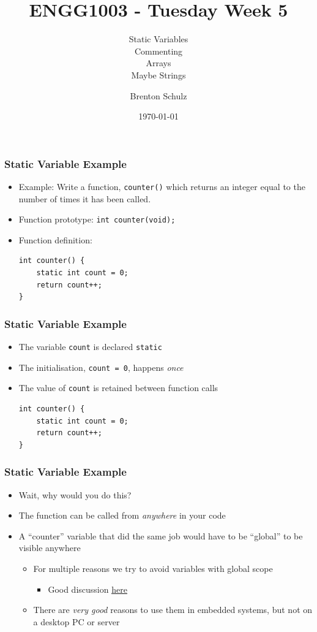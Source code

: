 \documentclass[14pt]{beamer}
\title{ENGG1003 - Tuesday Week 5}
\subtitle{Static Variables\\Commenting\\Arrays\\Maybe Strings}
\author{Brenton Schulz}
\institute{University of Newcastle}
\date{\today}
\begin{document}
\titlepage

\begin{frame}[fragile]
\frametitle{Static Variable Example}
\begin{itemize}
\item Example: Write a function, \texttt{counter()} which returns an integer equal to the number of times it has been called.
\pause
\item Function prototype: \texttt{int counter(void);}
\pause
\item Function definition:
\begin{lstlisting}[style=CStyle]
int counter() {
	static int count = 0;
	return count++;
}
\end{lstlisting}
\end{itemize}
\end{frame}

\begin{frame}[fragile]
\frametitle{Static Variable Example}
\begin{itemize}
\item The variable \texttt{count} is declared \texttt{static}
\item The initialisation, \texttt{count = 0}, happens \textit{once}
\item The value of \texttt{count} is retained between function calls 
\begin{lstlisting}[style=CStyle]
int counter() {
	static int count = 0;
	return count++;
}
\end{lstlisting}
\end{itemize}
\end{frame}

\begin{frame}
\frametitle{Static Variable Example}
\begin{itemize}
\item Wait, why would you do this?
\pause
\item The function can be called from \textit{anywhere} in your code
\pause
\item A ``counter'' variable that did the same job would have to be ``global'' to be visible anywhere
	\begin{itemize}
\pause
		\item For multiple reasons we try to avoid variables with global scope
			\begin{itemize}
				\item Good discussion \underline{\href{http://wiki.c2.com/?GlobalVariablesAreBad}{here}}
			\end{itemize}
\pause
		\item There are \textit{very good} reasons to use them in embedded systems, but not on a desktop PC or server
	\end{itemize}
\end{itemize}
\end{frame}
\end{document}
